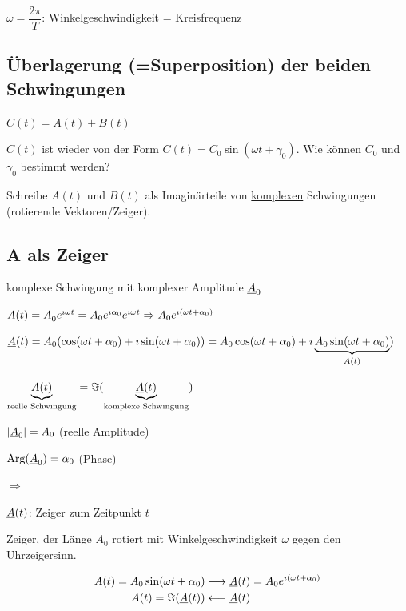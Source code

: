 $\omega = \dfrac{2\pi}{T}$: Winkelgeschwindigkeit = Kreisfrequenz

\clearpage
\subsection{Überlagerung (=Superposition) der beiden Schwingungen}

\qquad$C(t) = A(t) + B(t)$

$C(t)$ ist wieder von der Form $C(t)=C_0\sin(\omega t + \gamma_0)$. Wie können $C_0$ und $\gamma_0$ bestimmt werden?

Schreibe $A(t)$ und $B(t)$ als Imaginärteile von \ul{komplexen} Schwingungen (rotierende Vektoren/Zeiger).


\clearpage
\subsection{A als Zeiger}
 \hfill komplexe Schwingung mit komplexer Amplitude $\underline{A}_0$


$\underline{A}(t)=\underline{A}_0e^{\imath\omega t}=A_0e^{\imath\alpha_0}e^{\imath\omega t}\\
\Rightarrow A_0e^{\imath(\omega t+\alpha_0)}$


$\underline{A}(t) = A_0(\cos(\omega t + \alpha_0)+\imath\sin(\omega t + \alpha_0))= A_0\cos(\omega t + \alpha_0)+\imath \underbrace{A_0\sin(\omega t + \alpha_0)}_{A(t)})$

$\underbrace{A(t)}_\text{reelle Schwingung} = \Im(\underbrace{\underline{A}(t)}_\text{komplexe Schwingung})$


$|\underline{A}_0|=A_0$ (reelle Amplitude)

$\mathbin\text{Arg}(\underline{A}_0)=\alpha_0$ (Phase)

$\Rightarrow$ 

$\underline{A}(t)$: Zeiger zum Zeitpunkt $t$

Zeiger, der Länge $A_0$ rotiert mit Winkelgeschwindigkeit $\omega$ gegen den Uhrzeigersinn.

\vspace{-1.5cm}
\begin{align*}
A(t) = A_0\sin(\omega t+\alpha_0) &\longrightarrow \underline{A}(t) = A_0e^{\imath(\omega t +\alpha_0)}\\
A(t) = \Im(\underline{A}(t)) &\longleftarrow \underline{A}(t)
\end{align*}

